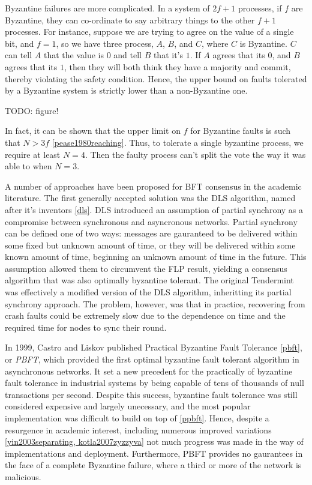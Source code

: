Byzantine failures are more complicated. In a system of $2f+1$ processes, if $f$ are Byzantine, 
they can co-ordinate to say arbitrary things to the other $f+1$ processes.
For instance, suppose we are trying to agree on the value of a single bit, 
and $f=1$, so we have three process, $A$, $B$, and $C$, where $C$ is Byzantine.
$C$ can tell $A$ that the value is $0$ and tell $B$ that it's $1$. 
If $A$ agrees that its $0$, and $B$ agrees that its $1$, then they will both think they have a majority and commit, 
thereby violating the safety condition.
Hence, the upper bound on faults tolerated by a Byzantine system is strictly lower than a non-Byzantine one.

TODO: figure!

In fact, it can be shown that the upper limit on $f$ for Byzantine faults is such that $N > 3f$ \ref{pease1980reaching}.
Thus, to tolerate a single byzantine process, we require at least $N=4$. 
Then the faulty process can't split the vote the way it was able to when $N=3$.

A number of approaches have been proposed for BFT consensus in the academic literature.
The first generally accepted solution was the DLS algorithm, named after it's inventors \ref{dls}.
DLS introduced an assumption of partial synchrony as a compromise between synchronous and asyncronous networks.
Partial synchrony can be defined one of two ways: 
messages are gauranteed to be delivered within some fixed but unknown amount of time,
or they will be delivered within some known amount of time, beginning an unknown amount of time in the future.
This assumption allowed them to circumvent the FLP result, yielding a consensus algorithm that was also optimally byzantine tolerant.
The original Tendermint was effectively a modified version of the DLS algorithm, inheritting its partial synchrony approach.
The problem, however, was that in practice, recovering from crash faults could be extremely slow due to the dependence on time and the required time for nodes to sync their round.

In 1999, Castro and Liskov published Practical Byzantine Fault Tolerance \ref{pbft}, or \emph{PBFT}, 
which provided the first optimal byzantine fault tolerant algorithm in asynchronous networks.
It set a new precedent for the practically of byzantine fault tolerance in industrial systems by being capable of 
tens of thousands of null transactions per second.
Despite this success, byzantine fault tolerance was still considered expensive and largely unecessary, 
and the most popular implementation was difficult to build on top of \ref{ppbft}.
Hence, despite a resurgence in academic interest, including numerous improved variations \ref{yin2003separating, kotla2007zyzzyva}
not much progress was made in the way of implementations and deployment.
Furthermore, PBFT provides no gaurantees in the face of a complete Byzantine failure, where a third or more of the network is malicious.

